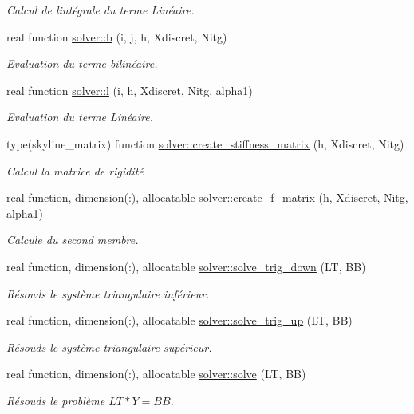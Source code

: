 \begin{DoxyCompactItemize}
\begin{DoxyCompactList}\small\item\em Calcul de l\textquotesingle{}intégrale du terme Linéaire. \end{DoxyCompactList}\item 
real function \hyperlink{namespacesolver_a99565d1c8ed5142211b78fe3ccca060b}{solver\+::b} (i, j, h, Xdiscret, Nitg)
\begin{DoxyCompactList}\small\item\em Evaluation du terme bilinéaire. \end{DoxyCompactList}\item 
real function \hyperlink{namespacesolver_a327c990a10263590618db7a31c4edcc9}{solver\+::l} (i, h, Xdiscret, Nitg, alpha1)
\begin{DoxyCompactList}\small\item\em Evaluation du terme Linéaire. \end{DoxyCompactList}\item 
type(skyline\+\_\+matrix) function \hyperlink{namespacesolver_aefd2f88bd66b9d9ccce170259a49c77d}{solver\+::create\+\_\+stiffness\+\_\+matrix} (h, Xdiscret, Nitg)
\begin{DoxyCompactList}\small\item\em Calcul la matrice de rigidité \end{DoxyCompactList}\item 
real function, dimension(\+:), allocatable \hyperlink{namespacesolver_af45a5f246a818112e6a257335c2b829d}{solver\+::create\+\_\+f\+\_\+matrix} (h, Xdiscret, Nitg, alpha1)
\begin{DoxyCompactList}\small\item\em Calcule du second membre. \end{DoxyCompactList}\item 
real function, dimension(\+:), allocatable \hyperlink{namespacesolver_ad8b8ef6c982475b3fb276f93660b750f}{solver\+::solve\+\_\+trig\+\_\+down} (LT, BB)
\begin{DoxyCompactList}\small\item\em Résouds le système triangulaire inférieur. \end{DoxyCompactList}\item 
real function, dimension(\+:), allocatable \hyperlink{namespacesolver_a08b8f70c86d7bf39b32ce8fdcc872fd4}{solver\+::solve\+\_\+trig\+\_\+up} (LT, BB)
\begin{DoxyCompactList}\small\item\em Résouds le système triangulaire supérieur. \end{DoxyCompactList}\item 
real function, dimension(\+:), allocatable \hyperlink{namespacesolver_af3691d2059a024a82bab7751a99e6006}{solver\+::solve} (LT, BB)
\begin{DoxyCompactList}\small\item\em Résouds le problème $ LT*Y = BB$. \end{DoxyCompactList}\end{DoxyCompactItemize}
